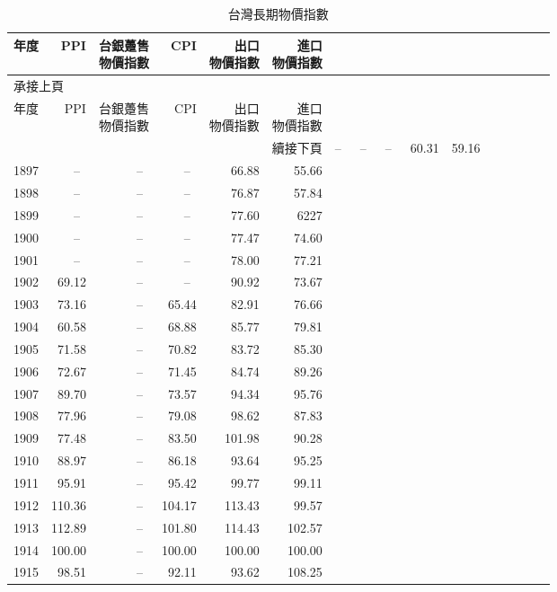\begin{enumerate}[a.)]
\begin{longtable}{@{}lrrrrr@{}}
		\caption{台灣長期物價指數}\label{ex_long} \\
		\toprule
		年度& PPI& \tabincell{c}{台銀躉售\\物價指數} & CPI 
		&  \tabincell{c}{出口\\物價指數} & \tabincell{c}{進口\\物價指數} \\
		\midrule
		\endfirsthead
		\multicolumn{6}{l}{承接上頁}\\[2pt]
		\toprule
		年度& PPI& \tabincell{c}{台銀躉售\\物價指數} & CPI 
		&  \tabincell{c}{出口\\物價指數} & \tabincell{c}{進口\\物價指數} \\
		\midrule
		\endhead
		\midrule
		\multicolumn{6}{r}{續接下頁}
		\endfoot
		\multicolumn{6}{r}{表格結束}
		\endlastfoot
		1896  &--~&--~&--~		&	60.31	  & 59.16\\
		1897  &--~&--~&--~		&	66.88	  & 55.66\\
		1898  &--~&--~&--~		&	76.87	  & 57.84\\
		1899  &--~&--~&--~		&	77.60	  & 6227\\
		1900  &--~&--~&--~		&	77.47	  & 74.60\\
		1901  &--~&--~&--~		&	78.00	  &	77.21\\
		1902  & 69.12  &--~ & --~ &  90.92    & 73.67 \\
		1903  & 73.16  &--~ &  65.44 &  82.91 & 76.66 \\
		1904  &  60.58 &--~  & 68.88  & 85.77 &  79.81\\
		1905  & 71.58 &--~  & 70.82  & 83.72  & 85.30 \\
		1906  & 72.67 &--~  & 71.45  & 84.74  & 89.26 \\
		1907  & 89.70 &--~ &  73.57  & 94.34  & 95.76 \\
		1908  & 77.96 &--~  & 79.08 &  98.62  & 87.83 \\
		1909  & 77.48 &--~  & 83.50  & 101.98 &  90.28\\ 
		1910  &  88.97 &--~ & 86.18 &  93.64  & 95.25\\
		1911  & 95.91 &--~  & 95.42 &  99.77  & 99.11\\
		1912  & 110.36 &--~  & 104.17 &  113.43  & 99.57 \\
		1913  & 112.89 &--~  & 101.80  & 114.43  & 102.57 \\
		1914  & 100.00 &--~ &  100.00  & 100.00  & 100.00 \\
		1915  & 98.51 &--~  & 92.11   & 93.62  & 108.25\\

\end{longtable}
\end{enumerate}
